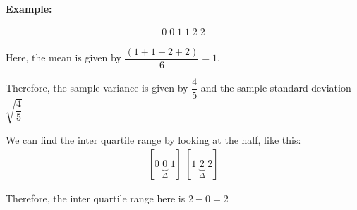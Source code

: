 \par\bigskip
\noindent\textbf{Example:}\par
\begin{equation*}
  \begin{gathered}
    0\;0\;1\;1\;2\;2
  \end{gathered}
\end{equation*}\par
\noindent Here, the mean is given by $\dfrac{(1+1+2+2)}{6} = 1$.\par
\noindent Therefore, the sample variance is given by $\dfrac{4}{5}$ and the sample standard deviation $\sqrt{\dfrac{4}{5}}$\par
\noindent We can find the inter quartile range by looking at the half, like this:
\begin{equation*}
  \begin{gathered}
    [0\;\underbrace{0}_{\text{$\Delta$}}\;1]\;[1\;\underbrace{2}_{\text{$\Delta$}}\;2]
  \end{gathered}
\end{equation*}\par
\noindent Therefore, the inter quartile range here is $2-0=2$
\par\bigskip
